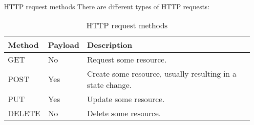 \documentclass[../index.tex]{subfiles}
\begin{document}
\renewcommand{\currenttitle}{HTTP request methods}
\begin{frame}{\currenttitle}
  There are different types of HTTP requests: \\

  \begin{table}
    \begin{tabular}{l l p{}} \hline
      \textbf{Method} & \textbf{Payload} & \textbf{Description} \\ \hline
      GET             & No               & Request some resource. \\
      POST            & Yes              & Create some resource, usually resulting in a state change. \\
      PUT             & Yes              & Update some resource. \\
      DELETE          & No               & Delete some resource. \\ \hline
    \end{tabular}
    \caption{HTTP request methods}
  \end{table}
\end{frame}
\end{document}
